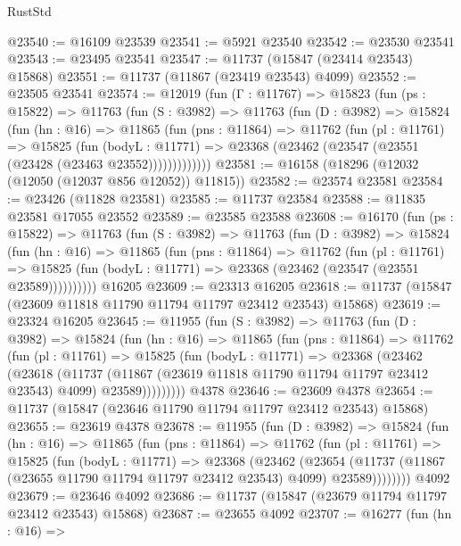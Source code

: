 \begin{lexlean}{RustStd}
\begin{coremodule}
@23540 := @16109 @23539
@23541 := @5921 @23540
@23542 := @23530 @23541
@23543 := @23495 @23541
@23547 := @11737 (@15847 (@23414 @23543) @15868)
@23551 := @11737 (@11867 (@23419 @23543) @4099)
@23552 := @23505 @23541
@23574 := @12019
    (fun (Γ : @11767) =>
    @15823
      (fun (ps : @15822) =>
      @11763
        (fun (S : @3982) =>
        @11763
          (fun (D : @3982) =>
          @15824
            (fun (hn : @16) =>
            @11865
              (fun (pns : @11864) =>
              @11762
                (fun (pl : @11761) =>
                @15825
                  (fun (bodyL : @11771) =>
                  @23368 (@23462 (@23547 (@23551 (@23428 (@23463 @23552)))))))))))))
@23581 := @16158 (@18296 (@12032 (@12050 (@12037 @856 @12052)) @11815))
@23582 := @23574 @23581
@23584 := @23426 (@11828 @23581)
@23585 := @11737 @23584
@23588 := @11835 @23581 @17055 @23552
@23589 := @23585 @23588
@23608 := @16170
    (fun (ps : @15822) =>
    @11763
      (fun (S : @3982) =>
      @11763
        (fun (D : @3982) =>
        @15824
          (fun (hn : @16) =>
          @11865
            (fun (pns : @11864) =>
            @11762
              (fun (pl : @11761) =>
              @15825 (fun (bodyL : @11771) => @23368 (@23462 (@23547 (@23551 @23589))))))))))
    @16205
@23609 := @23313 @16205
@23618 := @11737 (@15847 (@23609 @11818 @11790 @11794 @11797 @23412 @23543) @15868)
@23619 := @23324 @16205
@23645 := @11955
    (fun (S : @3982) =>
    @11763
      (fun (D : @3982) =>
      @15824
        (fun (hn : @16) =>
        @11865
          (fun (pns : @11864) =>
          @11762
            (fun (pl : @11761) =>
            @15825
              (fun (bodyL : @11771) =>
              @23368
                (@23462
                  (@23618
                    (@11737
                      (@11867 (@23619 @11818 @11790 @11794 @11797 @23412 @23543) @4099)
                      @23589)))))))))
    @4378
@23646 := @23609 @4378
@23654 := @11737 (@15847 (@23646 @11790 @11794 @11797 @23412 @23543) @15868)
@23655 := @23619 @4378
@23678 := @11955
    (fun (D : @3982) =>
    @15824
      (fun (hn : @16) =>
      @11865
        (fun (pns : @11864) =>
        @11762
          (fun (pl : @11761) =>
          @15825
            (fun (bodyL : @11771) =>
            @23368
              (@23462
                (@23654
                  (@11737 (@11867 (@23655 @11790 @11794 @11797 @23412 @23543) @4099) @23589))))))))
    @4092
@23679 := @23646 @4092
@23686 := @11737 (@15847 (@23679 @11794 @11797 @23412 @23543) @15868)
@23687 := @23655 @4092
@23707 := @16277
    (fun (hn : @16) =>

\end{coremodule}
\end{lexlean}
